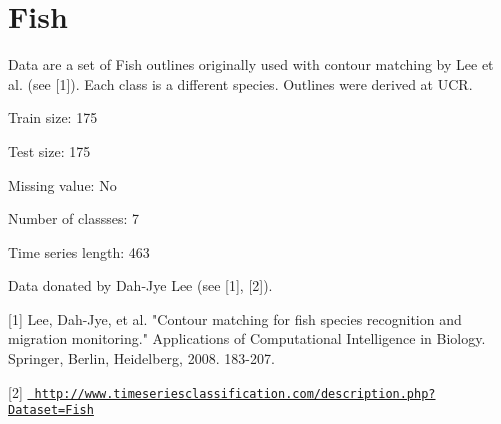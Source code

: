 \chapter{Fish}
\hypertarget{md_external_2data_2UCRArchive__2018_2Fish_2README}{}\label{md_external_2data_2UCRArchive__2018_2Fish_2README}
\label{md_external_2data_2UCRArchive__2018_2Fish_2README_autotoc_md73}%
%
 Data are a set of Fish outlines originally used with contour matching by Lee et al. (see \mbox{[}1\mbox{]}). Each class is a different species. Outlines were derived at UCR.

Train size\+: 175

Test size\+: 175

Missing value\+: No

Number of classses\+: 7

Time series length\+: 463

Data donated by Dah-\/\+Jye Lee (see \mbox{[}1\mbox{]}, \mbox{[}2\mbox{]}).

\mbox{[}1\mbox{]} Lee, Dah-\/\+Jye, et al. "{}\+Contour matching for fish species recognition and migration monitoring."{} Applications of Computational Intelligence in Biology. Springer, Berlin, Heidelberg, 2008. 183-\/207.

\mbox{[}2\mbox{]} \href{http://www.timeseriesclassification.com/description.php?Dataset=Fish}{\texttt{ http\+://www.\+timeseriesclassification.\+com/description.\+php?\+Dataset=\+Fish}} 